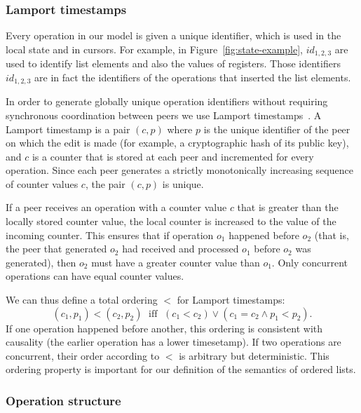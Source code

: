 \documentclass[a4paper,twocolumn,10pt]{article}
\begin{document}
\subsubsection{Lamport timestamps}

Every operation in our model is given a unique identifier, which is used in the local state and in cursors. For example, in Figure~\ref{fig:state-example}, $\mathit{id}_{1,2,3}$ are used to identify list elements and also the values of registers. Those identifiers $\mathit{id}_{1,2,3}$ are in fact the identifiers of the operations that inserted the list elements.

In order to generate globally unique operation identifiers without requiring synchronous coordination between peers we use Lamport timestamps~\cite{Lamport:1978jq}. A Lamport timestamp is a pair $(c, p)$ where $p$ is the unique identifier of the peer on which the edit is made (for example, a cryptographic hash of its public key), and $c$ is a counter that is stored at each peer and incremented for every operation. Since each peer generates a strictly monotonically increasing sequence of counter values $c$, the pair $(c, p)$ is unique.

If a peer receives an operation with a counter value $c$ that is greater than the locally stored counter value, the local counter is increased to the value of the incoming counter. This ensures that if operation $o_1$ happened before $o_2$ (that is, the peer that generated $o_2$ had received and processed $o_1$ before $o_2$ was generated), then $o_2$ must have a greater counter value than $o_1$. Only concurrent operations can have equal counter values.

We can thus define a total ordering $<$ for Lamport timestamps:
\[ (c_1, p_1) < (c_2, p_2) \;\text{ iff }\; (c_1 < c_2) \vee (c_1 = c_2 \wedge p_1 < p_2). \]
If one operation happened before another, this ordering is consistent with causality (the earlier operation has a lower timesetamp). If two operations are concurrent, their order according to $<$ is arbitrary but deterministic. This ordering property is important for our definition of the semantics of ordered lists.

\subsubsection{Operation structure}
\end{document}
